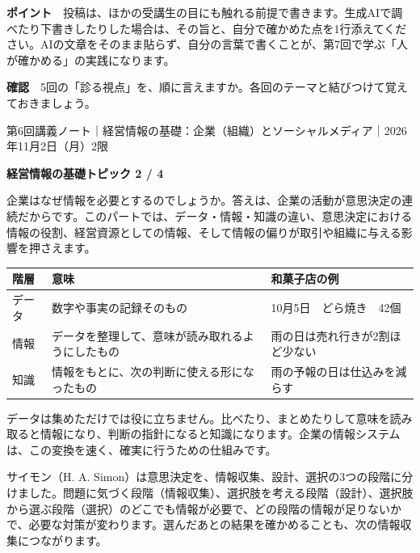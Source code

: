 \documentclass[paper=a4paper,fontsize=10pt,line_length=170mm,number_of_lines=46,baselineskip=1.6zw]{jlreq}
\newcommand\topichead[4]{%
  {\sffamily\footnotesize\color{grayt}#1\par}\vspace{1.5mm}
  {\sffamily\bfseries\LARGE #4}\hfill\colorbox{accent}{\sffamily\footnotesize\bfseries トピック #2 / #3}\par
  \vspace{1.2mm}{\color{ink}\hrule height 0.6pt}\vspace{3mm}}
\newcommand\subhead[1]{\par\vspace{2.6mm}{\sffamily\bfseries\large #1}\par\vspace{1.3mm}}
\begin{document}
\begin{hintbox}
{\sffamily\bfseries ポイント}　投稿は、ほかの受講生の目にも触れる前提で書きます。生成AIで調べたり下書きしたりした場合は、その旨と、自分で確かめた点を1行添えてください。AIの文章をそのまま貼らず、自分の言葉で書くことが、第7回で学ぶ「人が確かめる」の実践になります。\par
\end{hintbox}
\begin{checkbox}
{\sffamily\bfseries 確認}　5回の「診る視点」を、順に言えますか。各回のテーマと結びつけて覚えておきましょう。\par
\end{checkbox}
\clearpage
\topichead{第6回講義ノート｜経営情報の基礎：企業（組織）とソーシャルメディア｜2026年11月2日（月）2限}{2}{4}{経営情報の基礎}
企業はなぜ情報を必要とするのでしょうか。答えは、企業の活動が意思決定の連続だからです。このパートでは、データ・情報・知識の違い、意思決定における情報の役割、経営資源としての情報、そして情報の偏りが取引や組織に与える影響を押さえます。\par\vspace{1.2mm}
\subhead{データ・情報・知識}
\begin{center}\small\renewcommand{\arraystretch}{1.15}\setlength{\tabcolsep}{1.5mm}
\begin{tabular}{|p{24.0mm}|p{68.0mm}|p{68.0mm}|}\arrayrulecolor{rulec}\hline
\rowcolor{papertwo}\sffamily\bfseries 階層 & \sffamily\bfseries 意味 & \sffamily\bfseries 和菓子店の例\\\hline
データ & 数字や事実の記録そのもの & 10月5日　どら焼き　42個\\\hline
情報 & データを整理して、意味が読み取れるようにしたもの & 雨の日は売れ行きが2割ほど少ない\\\hline
知識 & 情報をもとに、次の判断に使える形になったもの & 雨の予報の日は仕込みを減らす\\\hline
\end{tabular}\end{center}\vspace{0.5mm}
データは集めただけでは役に立ちません。比べたり、まとめたりして意味を読み取ると情報になり、判断の指針になると知識になります。企業の情報システムは、この変換を速く、確実に行うための仕組みです。\par\vspace{1.2mm}
\subhead{意思決定における情報の役割}
サイモン（H. A. Simon）は意思決定を、情報収集、設計、選択の3つの段階に分けました。問題に気づく段階（情報収集）、選択肢を考える段階（設計）、選択肢から選ぶ段階（選択）のどこでも情報が必要で、どの段階の情報が足りないかで、必要な対策が変わります。選んだあとの結果を確かめることも、次の情報収集につながります。\par\vspace{1.2mm}
\end{document}
